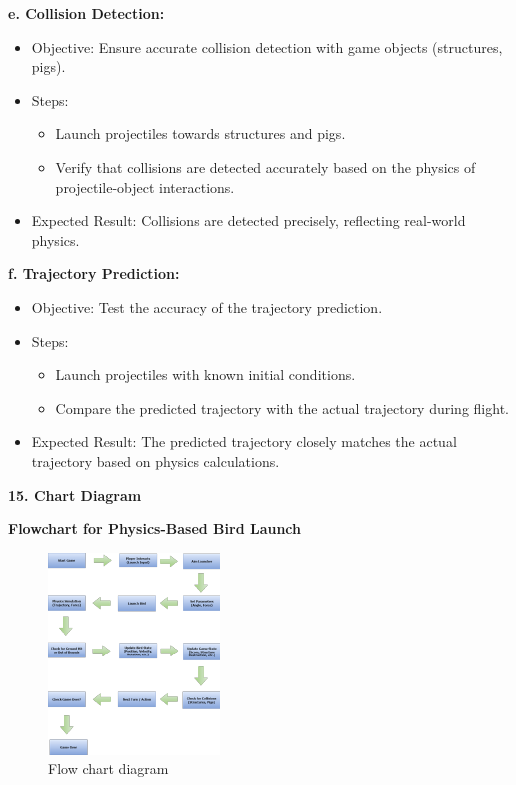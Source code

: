 \documentclass[
]{article}
\begin{document}
\textbf{e. Collision Detection:}

\begin{itemize}
\item
  Objective: Ensure accurate collision detection with game objects
  (structures, pigs).
\item
  Steps:

  \begin{itemize}
  \item
    Launch projectiles towards structures and pigs.
  \item
    Verify that collisions are detected accurately based on the physics
    of projectile-object interactions.
  \end{itemize}
\item
  Expected Result: Collisions are detected precisely, reflecting
  real-world physics.
\end{itemize}

\textbf{f. Trajectory Prediction:}

\begin{itemize}
\item
  Objective: Test the accuracy of the trajectory prediction.
\item
  Steps:

  \begin{itemize}
  \item
    Launch projectiles with known initial conditions.
  \item
    Compare the predicted trajectory with the actual trajectory during
    flight.
  \end{itemize}
\item
  Expected Result: The predicted trajectory closely matches the actual
  trajectory based on physics calculations.
\end{itemize}

\textbf{15. Chart Diagram}

\protect\hypertarget{Ajj}{}{}\textbf{Flowchart for Physics-Based Bird
Launch}

\begin{figure}
    \centering
    \includegraphics[width=0.5\linewidth]{Flowchartvnv.png}
    \caption{Flow chart diagram}
    \label{fig:enter-label}
\end{figure}
\end{document}
